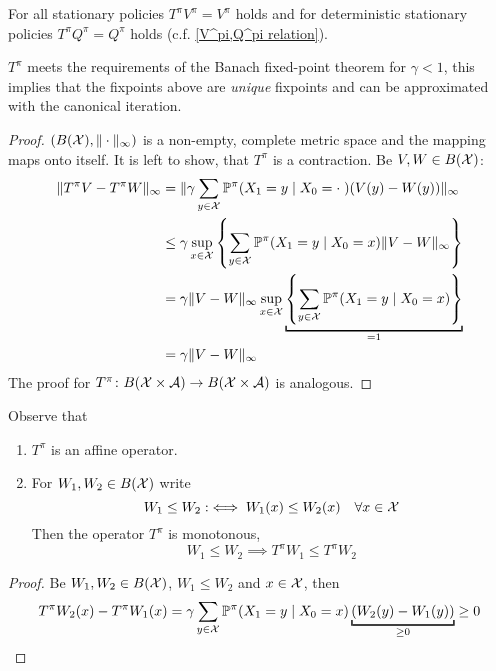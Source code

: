 \begin{remark}\label{T^pi unique}
	For all stationary policies \(T^\pi V^\pi=V^\pi \) holds and for deterministic stationary policies \(T^\pi Q^\pi=Q^\pi\) holds (c.f. \ref{V^pi,Q^pi relation}).

	\(T^\pi\) meets the requirements of the Banach fixed-point theorem  for \({\gamma<1}\), this implies that the fixpoints above are \emph{unique} fixpoints and can be approximated with the canonical iteration. 
\end{remark}

\begin{proof}
\((B(\mathcal{X}), \|\cdot\|_\infty)\) is a non-empty, complete metric space  and the mapping maps onto itself. It is left to show, that \(T^\pi\) is a contraction. Be \(V,W\in B(\mathcal{X})\):
\begin{align*}
	\|T^\pi V -T^\pi W\|_\infty 
	&=\|\gamma\sum_{y\in\cX} \Pr^\pi(X_1=y\mid X_0=\cdot\;) (V(y)-W(y))\|_\infty\\
	&\le\gamma \sup_{x\in\cX}\left\{ \sum_{y\in\cX} 
	\Pr^\pi(X_1=y\mid X_0=x) \|V-W\|_\infty \right\}\\
	&=\gamma \|V-W\|_\infty  \sup_{x\in\cX}\underbracket[1pt]{
		\left\{ \sum_{y\in\cX} \Pr^\pi(X_1=y\mid X_0=x) \right\}
	}_{=1}\\
	&=\gamma \|V-W\|_\infty
\end{align*}
The proof for \(T^\pi\colon B(\mathcal{X}\times\mathcal{A})\to B(\mathcal{X}\times\mathcal{A})\) is analogous.
\end{proof}

\begin{lemma}\label{properties T^pi} Observe that
	\begin{enumerate}
		\item \(T^\pi\) is an affine operator.
		\item For \(W_1,W_2\in B(\mathcal{X})\) write
		\[
			W_1 \le W_2 :\iff  W_1(x)\le W_2(x) \quad \forall x\in\mathcal{X}
		\]
		Then the operator \(T^\pi\) is monotonous, 
		\[W_1\le W_2 \implies T^\pi W_1\le T^\pi W_2\]
	\end{enumerate}
\end{lemma}

\begin{proof}
 Be \(W_1,W_2\in B(\mathcal{X})\), \(W_1\le W_2\) and \(x\in\mathcal{X}\), then
\[
	T^\pi W_2 (x) - T^\pi W_1(x) 
	= \gamma \sum_{y\in\cX} \Pr^\pi(X_1=y\mid X_0=x) \underbracket[1pt]{
		(W_2(y)-W_1(y))
	}_{\ge 0} \ge 0 \qedhere
\]
\end{proof}


